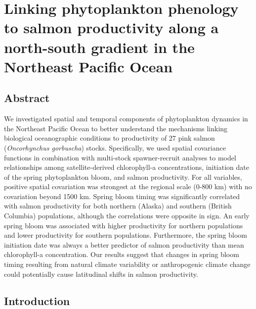 
\chapter[Phytoplankton phenology and salmon productivity]{Linking
  phytoplankton phenology to salmon productivity along a north-south gradient in
  the Northeast Pacific Ocean\footnotemark[1]}



\section{Abstract}

We investigated spatial and temporal components of phytoplankton dynamics in the
Northeast Pacific Ocean to better understand the mechanisms linking biological
oceanographic conditions to productivity of 27 pink salmon (\emph{Oncorhynchus
gorbuscha}) stocks. Specifically, we used spatial covariance functions in
combination with multi-stock spawner-recruit analyses to model relationships
among satellite-derived chlorophyll-a concentrations, initiation date of the
spring phytoplankton bloom, and salmon productivity. For all variables, positive
spatial covariation was strongest at the regional scale (0-800 km) with no
covariation beyond 1500 km. Spring bloom timing was significantly correlated
with salmon productivity for both northern (Alaska) and southern (British
Columbia) populations, although the correlations were opposite in sign. An early
spring bloom was associated with higher productivity for northern populations
and lower productivity for southern populations. Furthermore, the spring bloom
initiation date was always a better predictor of salmon productivity than mean
chlorophyll-a concentration. Our results suggest that changes in spring bloom
timing resulting from natural climate variability or anthropogenic climate
change could potentially cause latitudinal shifts in salmon productivity.



\section{Introduction}


